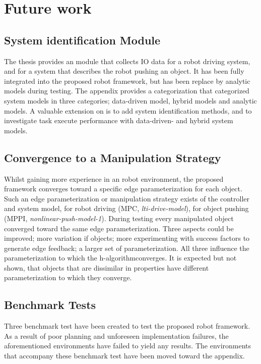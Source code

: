 \chapter{Future work}%
\label{chap:future_work}


\section*{System identification Module}
The thesis provides an module that collects \ac{IO} data for a robot driving system, and for a system that describes the robot pushing an object. It has been fully integrated into the proposed robot framework, but has been replace by analytic models during testing. The appendix provides a categorization that categorized system models in three categories; data-driven model, hybrid models and analytic models. A valuable extension on is to add system identification methods, and to investigate task execute performance with data-driven- and hybrid system models.\bs

\section*{Convergence to a Manipulation Strategy}
Whilst gaining more experience in an robot environment, the proposed framework converges toward a specific edge parameterization for each object. Such an edge parameterization or manipulation strategy exists of the controller and system model, for robot driving (\ac{MPC}, \textit{lti-drive-model}), for object pushing (\ac{MPPI}, \textit{nonlinear-push-model-1}). During testing every manipulated object converged toward the same edge parameterization. Three aspects could be improved; more variation if objects; more experimenting with success factors to generate edge feedback; a larger set of parameterization. All three influence the parameterization to which the \ac{h-algorithm}converges. It is expected but not shown, that objects that are dissimilar in properties have different parameterization to which they converge. 

\section*{Benchmark Tests}
Three benchmark test have been created to test the proposed robot framework. As a result of poor planning and unforeseen implementation failures, the aforementioned environments have failed to yield any results. The environments that accompany these benchmark test have been moved toward the appendix.\bs

